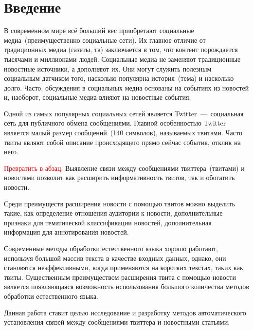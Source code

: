 \section*{Введение}
    В современном мире всё больший вес приобретают социальные медиа~(преимущественно социальные сети).
    Их главное отличие от традиционных медиа (газеты, тв) заключается в том, что контент порождается тысячами и миллионами людей.
    Социальные медиа не заменяют традиционные новостные источники, а дополняют их.
    Они могут служить полезным социальным датчиком того, насколько популярна история~(тема) и насколько долго.
    Часто, обсуждения в социальных медиа основаны на событиях из новостей и, наоборот, социальные медиа влияют на новостные события.

    Одной из самых популярных социальных сетей является Twitter~---~социальная сеть для публичного обмена сообщениями.
    Главной особенностью Twitter является малый размер сообщений~(140 символов), называемых твитами.
    Часто твиты являют собой описание происходящего прямо сейчас события, отклик на него.

    \textcolor{red}{Превратить в абзац.}
    Выявление связи между сообщениями твиттера~(твитами) и новостями позволит как расширить информативность твитов, так и обогатить новости.

    Среди преимуществ расширения новости с помощью твитов можно выделить такие, как определение отношения аудитории к новости,
    дополнительные признаки для тематической классификации новостей, дополнительная информация для аннотирования новостей.

    Современные методы обработки естественного языка хорошо работают, используя большой массив текста в качестве входных данных, однако, они становятся неэффективными,
    когда применяются на коротких текстах, таких как твиты.
    Существенным преимуществом расширения твита с помощью новости является появляющаяся возможность использования большого количества методов обработки естественного языка.

    Данная работа ставит целью исследование и разработку методов автоматического установления связей между сообщениями твиттера и новостными статьями.

    \clearpage